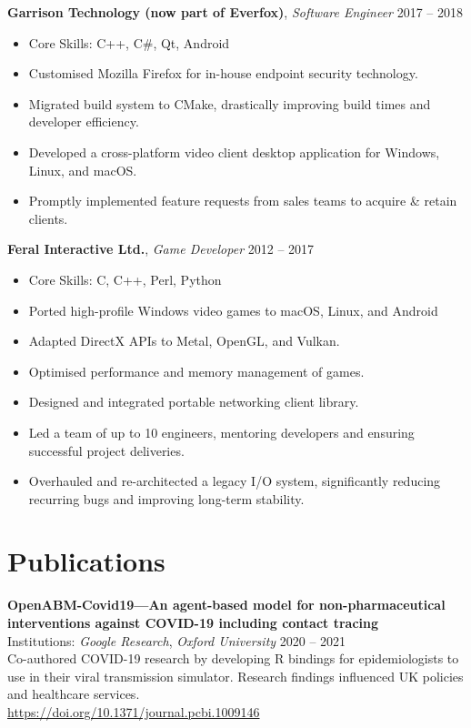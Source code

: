 \documentclass[a4paper,10pt]{article}
\newcommand{\coreskills}[1]{\item Core Skills: #1}
\begin{document}
{\begin{minipage}[t]{0.72\textwidth}
    \textbf{Garrison Technology (now part of Everfox)}, \textit{Software Engineer} \hfill 2017 -- 2018
    \begin{itemize}[leftmargin=1.5em, nosep]
        \coreskills{C++, C\#, Qt, Android}
        \item Customised Mozilla Firefox for in-house endpoint security technology.
        \item Migrated build system to CMake, drastically improving build times and developer efficiency.
        \item Developed a cross-platform video client desktop application for  Windows, Linux, and macOS.
        \item Promptly implemented feature requests from sales teams to acquire \& retain clients.
    \end{itemize}
    \vspace{0.5em}

    \textbf{Feral Interactive Ltd.}, \textit{Game Developer} \hfill 2012 -- 2017
    \begin{itemize}[leftmargin=1.5em, nosep]
        \coreskills{C, C++, Perl, Python}
        \item Ported high-profile Windows video games to macOS, Linux, and Android
        \item Adapted DirectX APIs to Metal, OpenGL, and Vulkan.
        \item Optimised performance and memory management of games.
        \item Designed and integrated portable networking client library.
        \item Led a team of up to 10 engineers, mentoring developers and ensuring successful project deliveries.
        \item Overhauled and re-architected a legacy I/O system, significantly reducing recurring bugs and improving long-term stability.
    \end{itemize}

    \section*{\color{navy} Publications}
    \textbf{OpenABM-Covid19—An agent-based model for non-pharmaceutical interventions against COVID-19 including contact tracing}\\
    Institutions: \textit{Google Research}, \textit{Oxford University} \hfill 2020 -- 2021\\[1.0em]
    Co-authored COVID-19 research by developing R bindings for epidemiologists to use in their viral transmission simulator. Research findings influenced UK policies and healthcare services.\\
    \href{https://doi.org/10.1371/journal.pcbi.1009146}{https://doi.org/10.1371/journal.pcbi.1009146}
\end{minipage}%
\vfill %
}%
\end{document}
